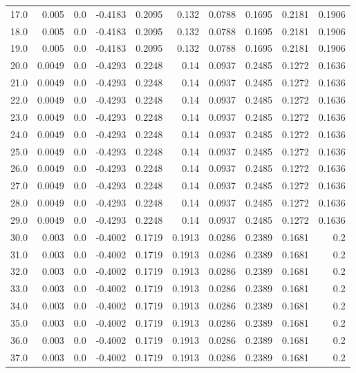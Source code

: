 \begin{longtable}{lrrrrrrrrr}
17.0 & 0.005 & 0.0 & -0.4183 & 0.2095 & 0.132 & 0.0788 & 0.1695 & 0.2181 & 0.1906 \\
18.0 & 0.005 & 0.0 & -0.4183 & 0.2095 & 0.132 & 0.0788 & 0.1695 & 0.2181 & 0.1906 \\
19.0 & 0.005 & 0.0 & -0.4183 & 0.2095 & 0.132 & 0.0788 & 0.1695 & 0.2181 & 0.1906 \\
20.0 & 0.0049 & 0.0 & -0.4293 & 0.2248 & 0.14 & 0.0937 & 0.2485 & 0.1272 & 0.1636 \\
21.0 & 0.0049 & 0.0 & -0.4293 & 0.2248 & 0.14 & 0.0937 & 0.2485 & 0.1272 & 0.1636 \\
22.0 & 0.0049 & 0.0 & -0.4293 & 0.2248 & 0.14 & 0.0937 & 0.2485 & 0.1272 & 0.1636 \\
23.0 & 0.0049 & 0.0 & -0.4293 & 0.2248 & 0.14 & 0.0937 & 0.2485 & 0.1272 & 0.1636 \\
24.0 & 0.0049 & 0.0 & -0.4293 & 0.2248 & 0.14 & 0.0937 & 0.2485 & 0.1272 & 0.1636 \\
25.0 & 0.0049 & 0.0 & -0.4293 & 0.2248 & 0.14 & 0.0937 & 0.2485 & 0.1272 & 0.1636 \\
26.0 & 0.0049 & 0.0 & -0.4293 & 0.2248 & 0.14 & 0.0937 & 0.2485 & 0.1272 & 0.1636 \\
27.0 & 0.0049 & 0.0 & -0.4293 & 0.2248 & 0.14 & 0.0937 & 0.2485 & 0.1272 & 0.1636 \\
28.0 & 0.0049 & 0.0 & -0.4293 & 0.2248 & 0.14 & 0.0937 & 0.2485 & 0.1272 & 0.1636 \\
29.0 & 0.0049 & 0.0 & -0.4293 & 0.2248 & 0.14 & 0.0937 & 0.2485 & 0.1272 & 0.1636 \\
30.0 & 0.003 & 0.0 & -0.4002 & 0.1719 & 0.1913 & 0.0286 & 0.2389 & 0.1681 & 0.2 \\
31.0 & 0.003 & 0.0 & -0.4002 & 0.1719 & 0.1913 & 0.0286 & 0.2389 & 0.1681 & 0.2 \\
32.0 & 0.003 & 0.0 & -0.4002 & 0.1719 & 0.1913 & 0.0286 & 0.2389 & 0.1681 & 0.2 \\
33.0 & 0.003 & 0.0 & -0.4002 & 0.1719 & 0.1913 & 0.0286 & 0.2389 & 0.1681 & 0.2 \\
34.0 & 0.003 & 0.0 & -0.4002 & 0.1719 & 0.1913 & 0.0286 & 0.2389 & 0.1681 & 0.2 \\
35.0 & 0.003 & 0.0 & -0.4002 & 0.1719 & 0.1913 & 0.0286 & 0.2389 & 0.1681 & 0.2 \\
36.0 & 0.003 & 0.0 & -0.4002 & 0.1719 & 0.1913 & 0.0286 & 0.2389 & 0.1681 & 0.2 \\
37.0 & 0.003 & 0.0 & -0.4002 & 0.1719 & 0.1913 & 0.0286 & 0.2389 & 0.1681 & 0.2 \\

\end{longtable}
